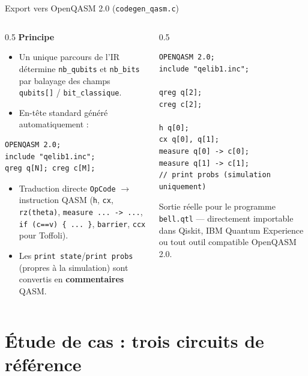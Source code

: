 \documentclass[10pt]{beamer}
\begin{document}
\begin{frame}[fragile]{Export vers OpenQASM 2.0 (\texttt{codegen\_qasm.c})}
  \begin{columns}[T]
    \begin{column}{0.5\textwidth}
      \textbf{Principe}
      \begin{itemize}
        \small
        \item Un unique parcours de l'IR détermine \texttt{nb\_qubits} et \texttt{nb\_bits} par balayage des champs \texttt{qubits[]} / \texttt{bit\_classique}.
        \item En-tête standard généré automatiquement :
      \end{itemize}
\begin{lstlisting}[basicstyle=\ttfamily\tiny]
OPENQASM 2.0;
include "qelib1.inc";
qreg q[N]; creg c[M];
\end{lstlisting}
      \begin{itemize}
        \small
        \item Traduction directe \texttt{OpCode} $\to$ instruction QASM (\texttt{h}, \texttt{cx}, \texttt{rz(theta)}, \texttt{measure ... -> ...}, \texttt{if (c==v) \{ ... \}}, \texttt{barrier}, \texttt{ccx} pour Toffoli).
        \item Les \texttt{print state}/\texttt{print probs} (propres à la simulation) sont convertis en \textbf{commentaires} QASM.
      \end{itemize}
    \end{column}
    \begin{column}{0.5\textwidth}
\begin{lstlisting}[basicstyle=\ttfamily\tiny,frame=single]
OPENQASM 2.0;
include "qelib1.inc";

qreg q[2];
creg c[2];

h q[0];
cx q[0], q[1];
measure q[0] -> c[0];
measure q[1] -> c[1];
// print probs (simulation uniquement)
\end{lstlisting}
      {\footnotesize Sortie réelle pour le programme \texttt{bell.qtl} --- directement importable dans Qiskit, IBM Quantum Experience ou tout outil compatible OpenQASM 2.0.}
    \end{column}
  \end{columns}
\end{frame}

\section{Étude de cas : trois circuits de référence}
\end{document}
